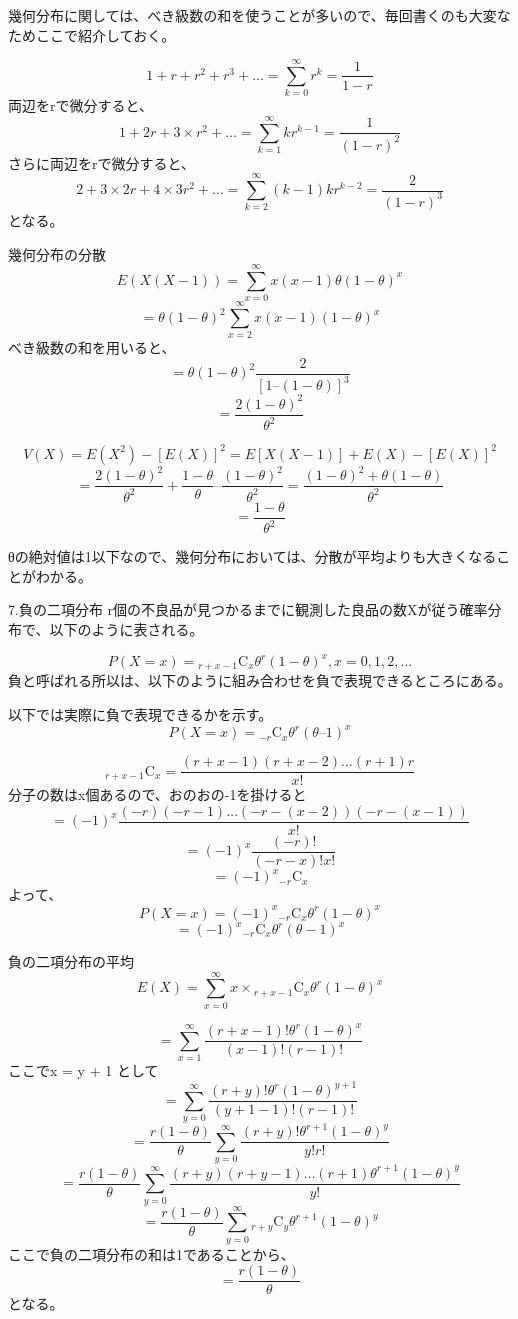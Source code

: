 \documentclass[]{article}
\begin{document}
幾何分布に関しては、べき級数の和を使うことが多いので、毎回書くのも大変なためここで紹介しておく。

\[ 1 + r + r^2 + r^3 + \dots = \sum_{k=0}^{\infty} r^k = \frac{1}{1-r}\]
両辺をrで微分すると、
\[ 1 + 2r + 3\times r^2 + \dots = \sum_{k=1}^{\infty} kr^{k-1} = \frac{1}{(1-r)^2}\]
さらに両辺をrで微分すると、
\[ 2 + 3\times2 r + 4\times 3 r^2 + \dots = \sum_{k=2}^{\infty} (k-1)kr^{k-2} = \frac{2}{(1-r)^3}\]
となる。

幾何分布の分散
\[ E(X(X-1)) = \sum_{x=0}^{\infty} x(x-1) \theta ( 1-\theta)^x \]
\[ = \theta (1-\theta)^2 \sum_{x=2}^{\infty} x(x-1) ( 1-\theta)^x \]
べき級数の和を用いると、
\[ = \theta (1-\theta)^2 \frac{2}{\left[ 1 – (1-\theta) \right]^3 }\]
\[ = \frac{2(1-\theta)^2}{\theta^2} \]

\[V(X)=E(X^2)-[ E(X) ]^2 =E[X(X-1)] + E(X) -[ E(X) ]^2 \]
\[ = \frac{2(1-\theta)^2}{\theta^2} + \frac{1-\theta}{\theta} – \frac{(1-\theta)^2}{\theta^2} = \frac{(1-\theta)^2 + \theta(1-\theta)}{\theta^2} \]
\[ = \frac{1-\theta}{\theta^2}\]

θの絶対値は1以下なので、幾何分布においては、分散が平均よりも大きくなることがわかる。

7.負の二項分布
r個の不良品が見つかるまでに観測した良品の数Xが従う確率分布で、以下のように表される。

\[P(X=x)={}_{r+x-1} \mathrm{C} _x \theta^r (1-\theta)^x , x=0,1,2,\dots\]
負と呼ばれる所以は、以下のように組み合わせを負で表現できるところにある。

以下では実際に負で表現できるかを示す。
\[P(X=x)={}_{-r} \mathrm{C} _x \theta^r(\theta – 1)^x\]

\[ {}_{r+x-1} \mathrm{C} _x = \frac{(r+x-1)(r+x-2)\dots(r+1)r}{x!} \]
分子の数はx個あるので、おのおの-1を掛けると
\[ = (-1)^x \frac{(-r)(-r-1)\dots(-r-(x-2))(-r-(x-1))}{x!}\]
\[ = (-1)^x \frac{(-r)!}{(-r-x)!x!}\]
\[ = (-1)^x {}_{-r} \mathrm{C} _x \] よって、
\[P(X=x)=(-1)^x {}_{-r} \mathrm{C} _x \theta^r (1-\theta)^x \]
\[ =(-1)^x {}_{-r} \mathrm{C} _x \theta^r (\theta-1)^x \]

負の二項分布の平均
\[E(X) = \sum_{x=0}^{\infty} x \times {}_{r+x-1} \mathrm{C} _x \theta^r (1-\theta)^x \]

\[ =\sum_{x=1}^{\infty} \frac{(r+x-1)!\theta^r (1-\theta)^x}{(x-1)!(r-1)!} \]
ここでx = y + 1 として
\[ =\sum_{y=0}^{\infty} \frac{(r+y)!\theta^r (1-\theta)^{y+1}}{(y+1-1)!(r-1)!} \]
\[ = \frac{r(1-\theta)}{\theta} \sum_{y=0}^{\infty} \frac{(r+y)! \theta^{r+1} (1-\theta)^{y}}{y!r!} \]
\[ = \frac{r(1-\theta)}{\theta} \sum_{y=0}^{\infty} \frac{(r+y)(r+y-1)\dots (r+1) \theta^{r+1} (1-\theta)^{y}}{y!} \]
\[ = \frac{r(1-\theta)}{\theta} \sum_{y=0}^{\infty} {}_{r+y} \mathrm{C} _{y} \theta^{r+1} (1-\theta)^y \]
ここで負の二項分布の和は1であることから、
\[ = \frac{r(1-\theta)}{\theta} \] となる。
\end{document}
